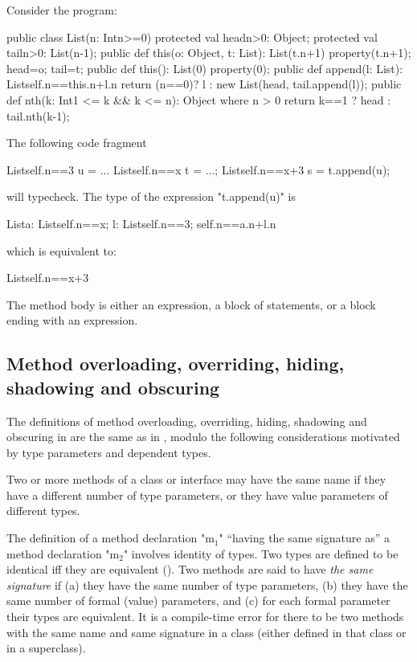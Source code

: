 \begin{example}
Consider the program:
\begin{xten}
public class List(n: Int{n>=0}) {
  protected val head{n>0}: Object;
  protected val tail{n>0}: List(n-1);
  public def this(o: Object, t: List): List(t.n+1) {
     property(t.n+1);
     head=o;
     tail=t;
  }
  public def this(): List(0) {
     property(0);
  }
  public def append(l: List): List{self.n==this.n+l.n} {
      return (n==0)? l
         : new List(head, tail.append(l)); 
  }
  public def nth(k: Int{1 <= k && k <= n}): Object
    where n > 0 {
      return k==1 ? head : tail.nth(k-1);
  }
}
\end{xten}

The following code fragment
\begin{xten}
List{self.n==3} u = ...
List{self.n==x} t = ...;
List{self.n==x+3} s = t.append(u);
\end{xten}
\noindent will typecheck. The type of the expression \xcd"t.append(u)" is 
\begin{xten}
List{a: List{self.n==x}; 
     l: List{self.n==3}; self.n==a.n+l.n}  
\end{xten}
\noindent which is equivalent to:
\begin{xten}
List{self.n==x+3}
\end{xten}
\end{example}

The method body is either an expression, a block of statements,
or a block ending with an expression.


\subsection{Method overloading, overriding, hiding, shadowing and obscuring}
\label{MethodOverload}

The definitions of method overloading, overriding, hiding, shadowing
and obscuring in \Xten{} are the same as in \Java, modulo the following
considerations motivated by type parameters and dependent types.

Two or more methods of a class or interface may have the same
name if they have a different number of type parameters, or
they have value parameters of different types.

The definition of a method declaration \xcdmath"m$_1$" ``having the same signature
as'' a method declaration \xcdmath"m$_2$" involves identity of types. Two \Xten{} types
are defined to be identical iff they are equivalent ().
Two methods are said to have {\em the same signature} if (a)
they have the same number of type parameters, (b) they have the
same number of formal (value) parameters, and (c) for each formal parameter
their types are equivalent. It is a compile-time error for there
to be two methods with the same name and same signature in a class
(either defined in that class or in a superclass).

